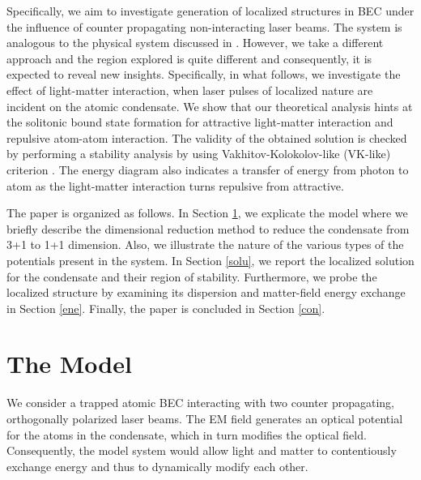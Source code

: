 \documentclass[epj]{svjour}
\begin{document}
Specifically, we aim to investigate generation of localized structures in BEC under the influence of counter propagating non-interacting laser beams. The system is analogous to the physical system discussed in \cite{dimitrova,ritsch1,ritsch2}. However, we take a different approach and the region explored is  quite different and consequently, it is expected to reveal new insights. Specifically, in what follows, we investigate the effect of light-matter interaction, when laser pulses of localized nature are incident on the atomic condensate. We show that our theoretical analysis hints at the solitonic bound state formation for attractive light-matter interaction and repulsive atom-atom interaction. The validity of the obtained solution is checked by performing a stability analysis by using Vakhitov-Kolokolov-like (VK-like) criterion \cite{vakhitov1973stationary,kivshar1989,das2}.  The energy diagram also indicates a transfer of energy from photon to atom as the light-matter interaction turns repulsive from attractive.



The paper is organized as follows. In Section \ref{model}, we explicate the model where we briefly describe the dimensional reduction method to reduce the condensate from 3+1 to 1+1 dimension. Also, we illustrate the nature of the various types of the potentials present in the system. In Section \ref{solu}, we report the localized solution for the condensate and their region of stability. Furthermore, we probe the localized structure by examining its dispersion and matter-field energy exchange in Section \ref{ene}. Finally, the paper is concluded in  Section \ref{con}.



\section{The Model}\label{model}
We consider a trapped atomic BEC interacting with two counter propagating, orthogonally polarized laser beams. The EM field generates an optical potential for the atoms in the condensate, which in turn modifies the optical field. Consequently, the model system would allow light and matter to contentiously exchange energy and thus to dynamically modify each other.
\end{document}
